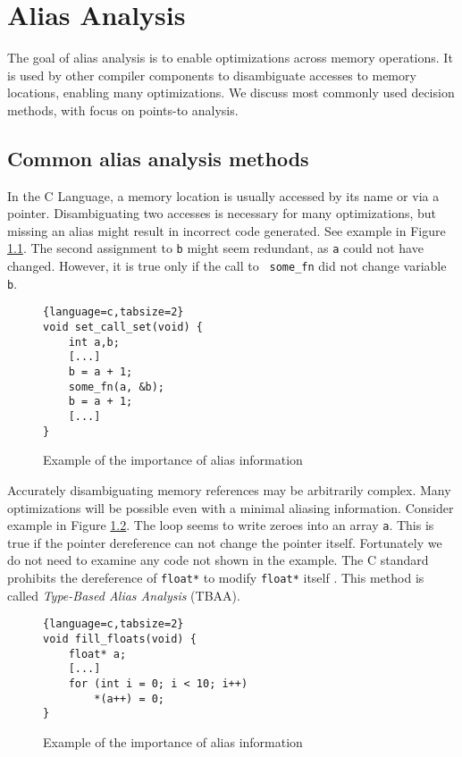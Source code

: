 \chapter{Alias Analysis}

The goal of alias analysis is to enable optimizations across memory operations.
It is used by other compiler components to disambiguate accesses to memory
locations, enabling many optimizations. We discuss most commonly used decision
methods, with focus on points-to analysis.

\section{Common alias analysis methods}

In the C Language, a memory location is usually accessed by its name or via a
pointer. Disambiguating two accesses is necessary for many optimizations, but missing an
alias might result in incorrect code generated. See example in Figure
\ref{alias-example1}. The second assignment to {\tt b} might seem redundant, as
{\tt a} could not have changed.  However, it is true only if the call to {\tt
some\_fn} did not change variable {\tt b}.

\begin{figure}[h!]
\begin{tcolorbox}
\begin{lstlisting}{language=c,tabsize=2}
void set_call_set(void) {
	int a,b;
	[...]
	b = a + 1;
	some_fn(a, &b);
	b = a + 1;
	[...]
}
\end{lstlisting}
\end{tcolorbox}
\caption{Example of the importance of alias information}
\label{alias-example1}
\end{figure}

Accurately disambiguating memory references may be arbitrarily complex. Many
optimizations will be possible even with a minimal aliasing information.
Consider example in Figure \ref{alias-example2}. The loop seems to write zeroes
into an array {\tt a}. This is true if the pointer dereference can not
change the pointer itself. Fortunately we do not need to examine any code not
shown in the example. The C standard prohibits the dereference of {\tt float*}
to modify {\tt float*} itself \cite{isoc}. This method is called {\it Type-Based
Alias Analysis} (TBAA).

\begin{figure}[h!]
\begin{tcolorbox}
\begin{lstlisting}{language=c,tabsize=2}
void fill_floats(void) {
	float* a;
	[...]
	for (int i = 0; i < 10; i++)
		*(a++) = 0;
}
\end{lstlisting}
\end{tcolorbox}
	\caption{Example of the importance of alias information}
	\label{alias-example2}
\end{figure}

